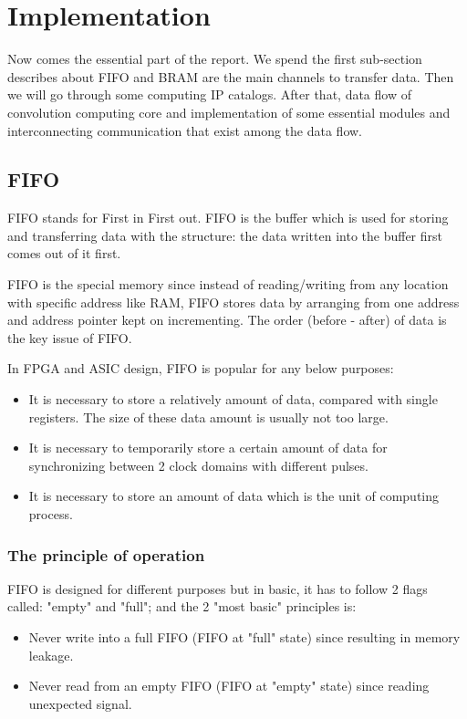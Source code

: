 \documentclass[a4paper, 12pt]{report}
\begin{document}
\chapter{Implementation}
Now comes the essential part of the report. We spend the first sub-section describes about FIFO and BRAM are the main channels to transfer data. Then we will go through some computing IP catalogs. After that, data flow of convolution computing core and implementation of some essential modules and interconnecting communication that exist among the data flow. 
\section{FIFO}

\cite{nandland}FIFO stands for First in First out. FIFO is the buffer which is used for storing and transferring data with the structure: the data written into the buffer first comes out of it first.

FIFO is the special memory since instead of reading/writing from any location with specific address like RAM, FIFO stores data by arranging from one address and address pointer kept on incrementing. The order (before - after) of data is the key issue of FIFO.

In FPGA and ASIC design, FIFO is popular for any below purposes:
\begin{itemize}
    \item It is necessary to store a relatively amount of data, compared with single registers. The size of these data amount is usually not too large.
    \item It is necessary to temporarily store a certain amount of data for synchronizing between 2 clock  domains with different pulses.
    \item It is necessary to store an amount of data which is the unit of computing process.
\end{itemize}

\subsection{The principle of operation}
FIFO is designed for different purposes but in basic, it has to follow 2 flags called: "empty" and "full"; and the 2 "most basic" principles is:
\begin{itemize}
    \item Never write into a full FIFO (FIFO at "full" state) since resulting in memory leakage.
    \item Never read from an empty FIFO (FIFO at "empty" state) since reading unexpected signal.
\end{itemize}
\end{document}
